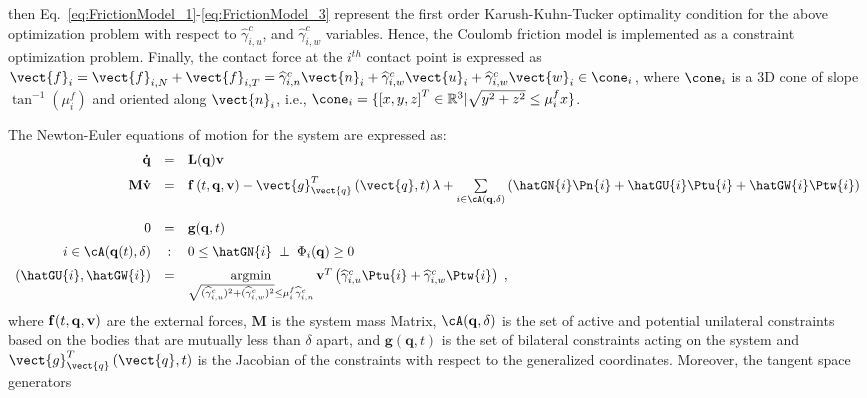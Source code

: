 then Eq.~\ref{eq:FrictionModel_1}-\ref{eq:FrictionModel_3} represent the first order Karush-Kuhn-Tucker optimality condition for the above optimization problem with respect to $\widehat{\gamma}^c_{i,u}$, and $\widehat{\gamma}^c_{i,w}$ variables. Hence, the Coulomb friction model is implemented as a constraint optimization problem. Finally, the contact force at the $i^{th}$ contact point is expressed as $\vect{f}_i=\vect{f}_{i,N}+\vect{f}_{i,T}=\widehat{\gamma}^c_{i,n}\vect{n}_i+\widehat{\gamma}^c_{i,w}\vect{u}_i+\widehat{\gamma}^c_{i,w}\vect{w}_i \in \cone_i$,  where $\cone_i$ is a 3D cone of slope $\tan^{-1}(\mu^f_{i})$ and oriented along $\vect{n}_i$, i.e., $\cone_i=\{\left[x,y,z\right]^T \in \mathbb{R}^3 | \sqrt{y^2+z^2} \leq \mu^f_{i} x\}$.


The Newton-Euler equations of motion for the system \cite{StTr95} are expressed as:
\begin{equation}
\label{eq:Newton_Euler}
\begin{gathered}
\begin{array}{rcl}
{\mathbf{\dot q}}   & = &  {\bf L}({\mathbf{q}}){\bf v} \vspace{0.2cm}  \\ 
{\mathbf{M}} {\mathbf{\dot v}} & = &{\mathbf{f}}\left( {t,  {\bf q} , {\bf v} } \right) -\vect{g}_{\vect{q}}^T\left(\vect{q},t\right)\lambda  + \vspace{0.2cm} \sum\limits_{i\in \cA({\bf q},\delta)} \left( \hatGN{i} \Pn{i} + \hatGU{i} \Ptu{i}  + \hatGW{i} \Ptw{i}  \right) \vspace{0.2cm} \\
0 & = & {\bf g}({\bf q},t)\vspace{0.2cm}  \\ 
i \in \cA({\bf q}(t),\delta)  &:&  0 \le \hatGN{i} \; \perp \; \Phi_{i}({\bf q}) \geq 0 \vspace{0.2cm} \\
\left(\hatGU{i}, \hatGW{i} \right)  &=&  \mathop {\mbox{argmin}}\limits_{\sqrt{(\widehat{\gamma}^c_{i,u})^2+(\widehat{\gamma}^c_{i,w})^2} \leq \mu^f_{i} \widehat{\gamma}^c_{i,n}} {\bf v}^T \left( \widehat{\gamma}^c_{i,u} \Ptu{i} + \widehat{\gamma}^c_{i,w} \Ptw{i} \right) \;,
\end{array}
\end{gathered} 
\end{equation}
where  $\mathbf{f}(t,  {\bf q} , {\bf v} ) $ are the external forces, $\textbf{M}$ is the system mass Matrix, $\cA({\bf q},\delta)$  is the set of active and potential unilateral constraints based on the bodies that are mutually less than $\delta$ apart, and $\textbf{g}(\textbf{q},t)$ is the set of bilateral constraints acting on the system and $\vect{g}_{\vect{q}}^T\left(\vect{q},t\right)$ is the Jacobian of the constraints with respect to the generalized coordinates. Moreover, the tangent space generators 
